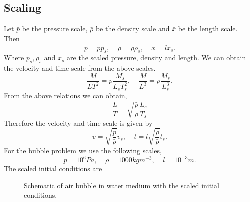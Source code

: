 \documentclass[a4paper]{article}
\begin{document}
\subsection*{Scaling}
Let $\bar{p}$ be the pressure scale, $\bar{\rho}$ be the density scale and $\bar{x}$ be the length scale. Then
\begin{equation}
    p = \bar{p}p_s, \;\;\;\; \rho = \bar{\rho} \rho_s, \;\;\;\; x = \bar{l}x_s. 
\end{equation}
Where $p_s, \rho_s$ and $x_s$ are the scaled pressure, density and length. We can obtain the velocity and time scale from the above scales.
\begin{equation}
    \frac{M}{LT^2} = \bar{p}\frac{M_s}{L_sT^2_s}, \;\;\;\; \frac{M}{L^3} = \bar{\rho}\frac{M_s}{L^3_s}.
\end{equation}
From the above relations we can obtain,
\begin{equation}
    \frac{L}{T} = \sqrt{\frac{\bar{p}}{\bar{\rho}}}\frac{L_s}{T_s}
\end{equation}
Therefore the velocity and time scale is given by
\begin{equation}
    v = \sqrt{\frac{\bar{p}}{\bar{\rho}}} v_s, \;\;\;\; t = \bar{l} \sqrt{\frac{\bar{\rho}}{\bar{p}}} t_s. 
\end{equation}
For the bubble problem we use the following scales,
\begin{equation}
    \bar{p} = 10^6Pa, \;\;\;\; \bar{\rho} = 1000 kgm^{-3}, \;\;\;\; \bar{l} = 10^{-3} m.
\end{equation}
The scaled initial conditions are
\begin{figure}[!h]
    \centering
    \caption{Schematic of air bubble in water medium with the scaled initial conditions.}
    \end{figure}
\end{document}
